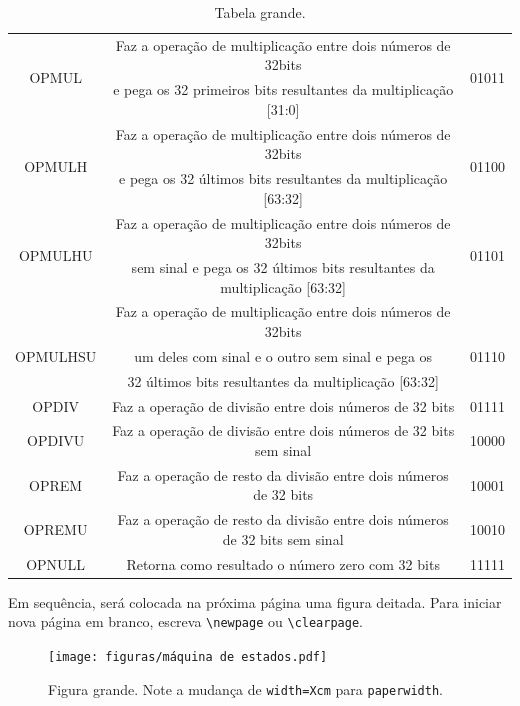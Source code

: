 \documentclass[9pt, twocolumn]{extarticle}
\begin{document}
\begin{table}[H]
\begin{tabular}{|c|c|c|}
				\hline
				\multirow{2}{*}{OPMUL} & Faz a operação de multiplicação entre dois números de 32bits & 
				\multirow{2}{*}{01011}\\
				& e pega os 32 primeiros bits resultantes da multiplicação [31:0] & \\
				\hline
				\multirow{2}{*}{OPMULH} & Faz a operação de multiplicação entre dois números de 32bits & 
				\multirow{2}{*}{01100}
				\\
				& e pega os 32 últimos bits resultantes da multiplicação [63:32] &\\
				\hline
				\multirow{2}{*}{OPMULHU} & Faz a operação de multiplicação entre dois números de 32bits & 
				\multirow{2}{*}{01101}\\
				& sem sinal e pega os 32 últimos bits resultantes da multiplicação [63:32] & \\
				\hline
				& Faz a operação de multiplicação entre dois números de 32bits &\\
				OPMULHSU & um deles com sinal e o outro sem sinal e pega os & 01110\\
				& 32 últimos bits resultantes da multiplicação [63:32] &\\
				\hline
				OPDIV & Faz a operação de divisão entre dois números de 32 bits & 01111\\
				\hline
				OPDIVU & Faz a operação de divisão entre dois números de 32 bits sem sinal & 10000\\
				\hline
				OPREM & Faz a operação de resto da divisão entre dois números de 32 bits & 10001\\
				\hline
				OPREMU & Faz a operação de resto da divisão entre dois números de 32 bits sem sinal & 10010\\
				\hline
				OPNULL & Retorna como resultado o número zero com 32 bits & 11111\\
				\hline
			\end{tabular}
			\caption{Tabela grande.}
		\end{table}
		
		Em sequência, será colocada na próxima página uma figura deitada. 
		Para iniciar nova página em branco, escreva \verb|\newpage| ou \verb|\clearpage|.
		
		\newpage
		\begin{figure}\centering
			\texttt{[image: figuras/máquina de estados.pdf]}
			\caption{%
				Figura grande. Note a mudança de {\tt width=Xcm} para {\tt paperwidth}.
			}
		\end{figure}
		
		
\end{document}
